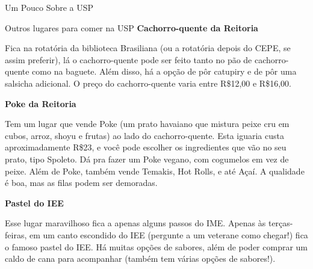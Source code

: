 \begin{secao}{Um Pouco Sobre a USP}
\begin{subsecao}{Outros lugares para comer na USP}
\textbf{Cachorro-quente da Reitoria}

Fica na rotatória da biblioteca Brasiliana (ou a rotatória depois do CEPE, se assim preferir),
lá o cachorro-quente pode ser feito tanto no pão de cachorro-quente como na baguete. Além disso,
há a opção de pôr catupiry e de pôr uma salsicha adicional. O preço do cachorro-quente varia
entre R\$12,00 e R\$16,00.

\textbf{Poke da Reitoria}

Tem um lugar que vende Poke (um prato havaiano que mistura peixe cru em cubos,
arroz, shoyu e frutas) ao lado do cachorro-quente. Esta iguaria custa
aproximadamente R\$23, e você pode escolher os ingredientes que vão no seu prato,
tipo Spoleto. Dá pra fazer um Poke vegano, com cogumelos em vez de peixe. Além de
Poke, também vende Temakis, Hot Rolls, e até Açaí. A qualidade é boa, mas as filas
podem ser demoradas.

\textbf{Pastel do IEE}

Esse lugar maravilhoso fica a apenas alguns passos do IME. Apenas às terças-feiras,
em um canto escondido do IEE (pergunte a um veterane como chegar!) fica o famoso pastel do IEE.
Há muitas opções de sabores, além de poder comprar um caldo de cana para acompanhar (também tem 
várias opções de sabores!).

\end{subsecao}

\end{secao}
